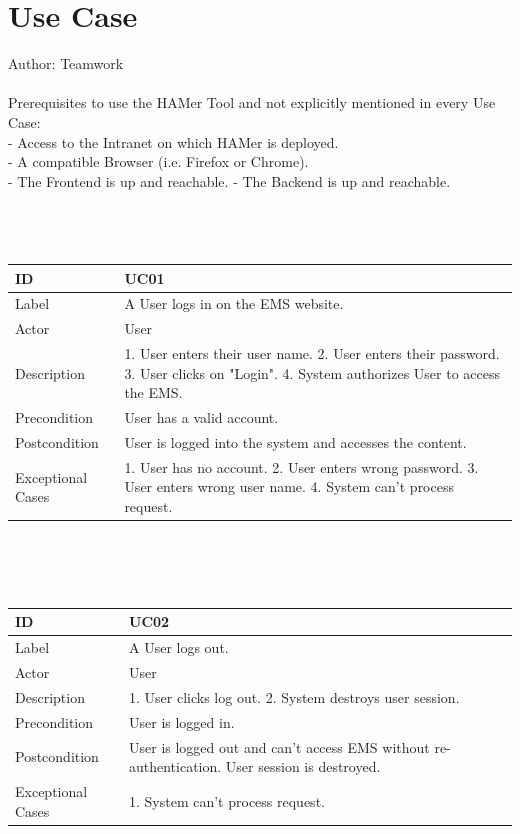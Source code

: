 \documentclass{scrreprt}
\begin{document}
\section{Use Case}
Author: Teamwork \\ \\
Prerequisites to use the HAMer Tool and not explicitly mentioned in every Use Case: \\
- Access to the Intranet on which HAMer is deployed.\\
- A compatible Browser (i.e. Firefox or Chrome). \\
- The Frontend is up and reachable.
- The Backend is up and reachable. \\
\\
\\ \\
\begin{tabularx}{12cm}{l|X}
ID & UC01  \\
\hline
Label & 
A User logs in on the EMS website. \\
\hline
Actor            & User    \\
\hline
Description            &  	1. User enters their user name. 2. User enters their password. 3. User clicks on "Login". 4. System authorizes User to access the EMS. \\
\hline
Precondition           &   User has a valid account.\\ 
\hline
Postcondition     & User is logged into the system and accesses the content. \\
\hline
Exceptional Cases & 1. User has no account. 2. User enters wrong password. 3. User enters wrong user name. 
4. System can't process request.
\end{tabularx}
\\
\\ \\
\begin{tabularx}{12cm}{l|X}
ID & UC02  \\
\hline
Label & 
A User logs out. \\
\hline
Actor            & User   \\
\hline
Description            &  	1. User clicks log out. 2. System destroys user session.  \\
\hline
Precondition           &   User is logged in.\\ 
\hline
Postcondition     & User is logged out and can't access EMS without re-authentication. User session is destroyed. \\
\hline
Exceptional Cases & 1. System can't process request.
\end{tabularx}
\end{document}
